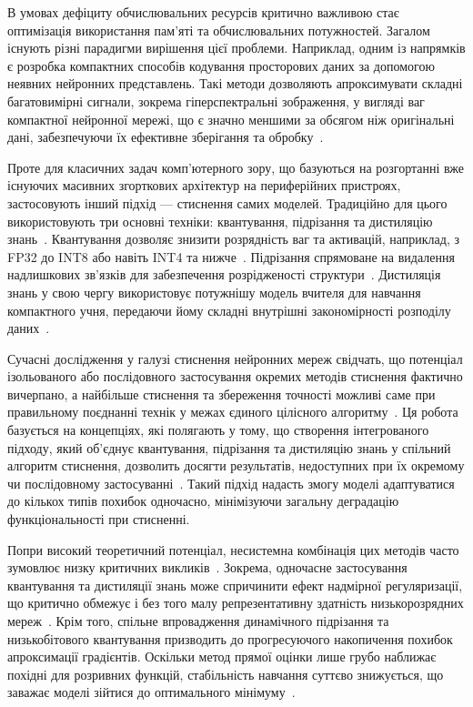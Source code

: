 \documentclass{pma-mthesis}
\begin{document}
В умовах дефіциту обчислювальних ресурсів критично важливою стає оптимізація використання пам'яті та обчислювальних потужностей. Загалом існують різні парадигми вирішення цієї проблеми. Наприклад, одним із напрямків є розробка компактних способів кодування просторових даних за допомогою неявних нейронних представлень. Такі методи дозволяють апроксимувати складні багатовимірні сигнали, зокрема гіперспектральні зображення, у вигляді ваг компактної нейронної мережі, що є значно меншими за обсягом ніж оригінальні дані, забезпечуючи їх ефективне зберігання та обробку~\cite{icpram2025}. 

Проте для класичних задач комп'ютерного зору, що базуються на розгортанні вже існуючих масивних згорткових архітектур на периферійних пристроях, застосовують інший підхід --- стиснення самих моделей. Традиційно для цього використовують три основні техніки: квантування, підрізання та дистиляцію знань~\cite{deep-learning-edge}. Квантування дозволяє знизити розрядність ваг та активацій, наприклад, з FP32 до INT8 або навіть INT4 та нижче~\cite{krishnamoorthi2018quantizing}. Підрізання спрямоване на видалення надлишкових зв'язків для забезпечення розрідженості структури~\cite{molchanov2017pruning}. Дистиляція знань у свою чергу використовує потужнішу модель вчителя для навчання компактного учня, передаючи йому складні внутрішні закономірності розподілу даних~\cite{hinton2014distilling}.

Сучасні дослідження у галузі стиснення нейронних мереж свідчать, що потенціал ізольованого або послідовного застосування окремих методів стиснення фактично вичерпано, а найбільше стиснення та збереження точності можливі саме при правильному поєднанні технік у межах єдиного цілісного алгоритму~\cite{Han2016DeepCompression}. Ця робота базується на концепціях, які полягають у тому, що створення інтегрованого підходу, який об'єднує квантування, підрізання та дистиляцію знань у спільний алгоритм стиснення, дозволить досягти результатів, недоступних при їх окремому чи послідовному застосуванні~\cite{kim2021pqk}. Такий підхід надасть змогу моделі адаптуватися до кількох типів похибок одночасно, мінімізуючи загальну деградацію функціональності при стисненні.

Попри високий теоретичний потенціал, несистемна комбінація цих методів часто зумовлює низку критичних викликів~\cite{Han2016DeepCompression}. Зокрема, одночасне застосування квантування та дистиляції знань може спричинити ефект надмірної регуляризації, що критично обмежує і без того малу репрезентативну здатність низькорозрядних мереж~\cite{kim2021pqk,kim2020qkd,Kim2023QuantizationRP}. Крім того, спільне впровадження динамічного підрізання та низькобітового квантування призводить до прогресуючого накопичення похибок апроксимації градієнтів. Оскільки метод прямої оцінки лише грубо наближає похідні для розривних функцій, стабільність навчання суттєво знижується, що заважає моделі зійтися до оптимального мінімуму~\cite{10946020}.
\end{document}

